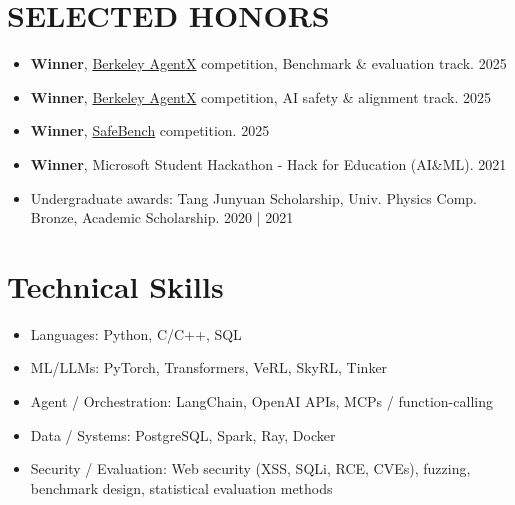 \documentclass[a4paper,9pt]{extarticle}
\begin{document}
\section*{SELECTED HONORS}
\begin{itemize}
    \item \textbf{Winner}, \href{https://rdi.berkeley.edu/agentx/}{Berkeley AgentX} competition, Benchmark \& evaluation track. \hfill 2025
    \item \textbf{Winner}, \href{https://rdi.berkeley.edu/agentx/}{Berkeley AgentX} competition, AI safety \& alignment track. \hfill 2025
    \item \textbf{Winner}, \href{https://www.mlsafety.org/safebench/winners}{SafeBench} competition. \hfill 2025
    \item \textbf{Winner}, Microsoft Student Hackathon - Hack for Education (AI\&ML). \hfill 2021
    \item Undergraduate awards: Tang Junyuan Scholarship, Univ. Physics Comp. Bronze, Academic Scholarship. \hfill 2020 | 2021
\end{itemize}

\section*{Technical Skills}
\begin{itemize}
\item Languages: Python, C/C++, SQL
\item ML/LLMs: PyTorch, Transformers, VeRL, SkyRL, Tinker
\item Agent / Orchestration: LangChain, OpenAI APIs, MCPs / function-calling
\item Data / Systems: PostgreSQL, Spark, Ray, Docker
\item Security / Evaluation: Web security (XSS, SQLi, RCE, CVEs), fuzzing, benchmark design, statistical evaluation methods
\end{itemize}
\end{document}
